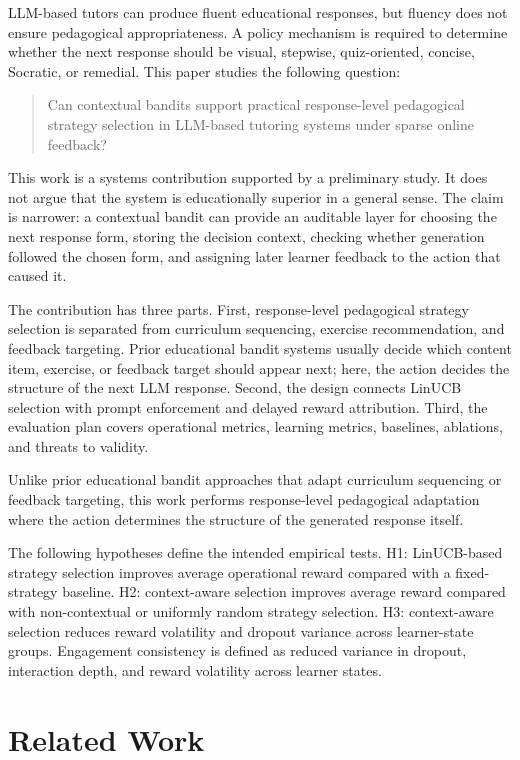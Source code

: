 \documentclass[conference]{IEEEtran}
\begin{document}
LLM-based tutors can produce fluent educational responses, but fluency does not ensure pedagogical appropriateness. A policy mechanism is required to determine whether the next response should be visual, stepwise, quiz-oriented, concise, Socratic, or remedial. This paper studies the following question:

\begin{quote}
Can contextual bandits support practical response-level pedagogical strategy selection in LLM-based tutoring systems under sparse online feedback?
\end{quote}

This work is a systems contribution supported by a preliminary study. It does not argue that the system is educationally superior in a general sense. The claim is narrower: a contextual bandit can provide an auditable layer for choosing the next response form, storing the decision context, checking whether generation followed the chosen form, and assigning later learner feedback to the action that caused it.

The contribution has three parts. First, response-level pedagogical strategy selection is separated from curriculum sequencing, exercise recommendation, and feedback targeting. Prior educational bandit systems usually decide which content item, exercise, or feedback target should appear next; here, the action decides the structure of the next LLM response. Second, the design connects LinUCB selection with prompt enforcement and delayed reward attribution. Third, the evaluation plan covers operational metrics, learning metrics, baselines, ablations, and threats to validity.

Unlike prior educational bandit approaches that adapt curriculum sequencing or feedback targeting, this work performs response-level pedagogical adaptation where the action determines the structure of the generated response itself.

The following hypotheses define the intended empirical tests. H1: LinUCB-based strategy selection improves average operational reward compared with a fixed-strategy baseline. H2: context-aware selection improves average reward compared with non-contextual or uniformly random strategy selection. H3: context-aware selection reduces reward volatility and dropout variance across learner-state groups. Engagement consistency is defined as reduced variance in dropout, interaction depth, and reward volatility across learner states.

\section{Related Work}
\end{document}
